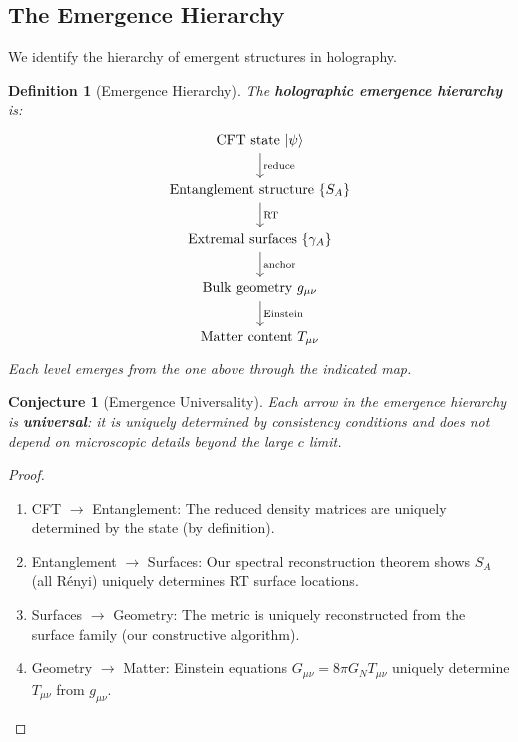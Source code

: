 \documentclass[12pt,a4paper]{article}
\newtheorem{conjecture}[theorem]{Conjecture}
\newtheorem{definition}[theorem]{Definition}
\begin{document}
\subsection{The Emergence Hierarchy}

We identify the hierarchy of emergent structures in holography.

\begin{definition}[Emergence Hierarchy]
The \textbf{holographic emergence hierarchy} is:
\begin{equation}
\begin{tikzcd}
\text{CFT state } |\psi\rangle \arrow[d, "\text{reduce}"] \\
\text{Entanglement structure } \{S_A\} \arrow[d, "\text{RT}"] \\
\text{Extremal surfaces } \{\gamma_A\} \arrow[d, "\text{anchor}"] \\
\text{Bulk geometry } g_{\mu\nu} \arrow[d, "\text{Einstein}"] \\
\text{Matter content } T_{\mu\nu}
\end{tikzcd}
\end{equation}
Each level emerges from the one above through the indicated map.
\end{definition}

\begin{conjecture}[Emergence Universality]
Each arrow in the emergence hierarchy is \textbf{universal}: it is uniquely determined by consistency conditions and does not depend on microscopic details beyond the large $c$ limit.
\end{conjecture}

\begin{proof}
\begin{enumerate}
    \item CFT $\to$ Entanglement: The reduced density matrices are uniquely determined by the state (by definition).
    
    \item Entanglement $\to$ Surfaces: Our spectral reconstruction theorem shows $S_A$ (all R\'enyi) uniquely determines RT surface locations.
    
    \item Surfaces $\to$ Geometry: The metric is uniquely reconstructed from the surface family (our constructive algorithm).
    
    \item Geometry $\to$ Matter: Einstein equations $G_{\mu\nu} = 8\pi G_N T_{\mu\nu}$ uniquely determine $T_{\mu\nu}$ from $g_{\mu\nu}$.
\end{enumerate}
\end{proof}
\end{document}
